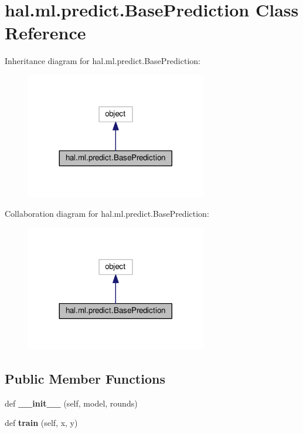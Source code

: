 \hypertarget{classhal_1_1ml_1_1predict_1_1_base_prediction}{}\section{hal.\+ml.\+predict.\+Base\+Prediction Class Reference}
\label{classhal_1_1ml_1_1predict_1_1_base_prediction}


Inheritance diagram for hal.\+ml.\+predict.\+Base\+Prediction\+:\nopagebreak
\begin{figure}[H]
\begin{center}
\leavevmode
\includegraphics[width=224pt]{classhal_1_1ml_1_1predict_1_1_base_prediction__inherit__graph}
\end{center}
\end{figure}


Collaboration diagram for hal.\+ml.\+predict.\+Base\+Prediction\+:\nopagebreak
\begin{figure}[H]
\begin{center}
\leavevmode
\includegraphics[width=224pt]{classhal_1_1ml_1_1predict_1_1_base_prediction__coll__graph}
\end{center}
\end{figure}
\subsection*{Public Member Functions}
\begin{DoxyCompactItemize}
\item 
def {\bfseries \+\_\+\+\_\+init\+\_\+\+\_\+} (self, model, rounds)\hypertarget{classhal_1_1ml_1_1predict_1_1_base_prediction_a77743bfb5de4846d30d3f41e7d2706df}{}\label{classhal_1_1ml_1_1predict_1_1_base_prediction_a77743bfb5de4846d30d3f41e7d2706df}

\item 
def {\bfseries train} (self, x, y)\hypertarget{classhal_1_1ml_1_1predict_1_1_base_prediction_a3bee607838f71f2ed205864a3f73d5f5}{}\label{classhal_1_1ml_1_1predict_1_1_base_prediction_a3bee607838f71f2ed205864a3f73d5f5}

\end{DoxyCompactItemize}
